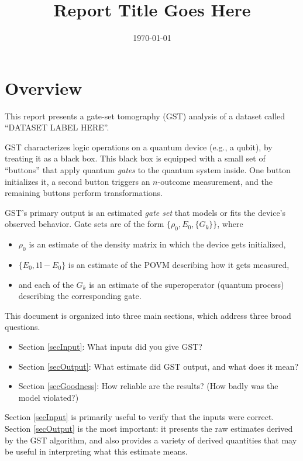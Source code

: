 \documentclass{article}[11pt]
\def\Id{1\!\mathrm{l}}
\newcommand{\putfield}[2]{#2}
\begin{document}
\title{\putfield{title}{Report Title Goes Here}}
\date{\vspace{-1cm}\today}

\begingroup
\let\center\flushleft
\let\endcenter\endflushleft
\maketitle
\endgroup

\tableofcontents

\section{Overview}
This report presents a gate-set tomography (GST) analysis of a dataset called ``\putfield{datasetLabel}{DATASET LABEL HERE}''.  

GST characterizes logic operations on a quantum device (e.g., a qubit), by treating it as a black box.  This black box is equipped with a small set of ``buttons'' that apply quantum \emph{gates} to the quantum system inside.  One button initializes it, a second button triggers an $n$-outcome measurement, and the remaining buttons perform transformations.  %

GST's primary output is an estimated \emph{gate set} that models or fits the device's observed behavior.  Gate sets are of the form $\{\rho_0,E_0,\{G_k\}\}$, where
\begin{itemize}
\item $\rho_0$ is an estimate of the density matrix in which the device gets initialized,
\item $\{E_0,\Id-E_0\}$ is an estimate of the POVM describing how it gets measured,
\item and each of the $G_k$ is an estimate of the superoperator (quantum process) describing the corresponding gate.
\end{itemize}

This document is organized into three main sections, which address three broad questions.
\begin{itemize}
\item Section \ref{secInput}:  What inputs did you give GST?
\item Section \ref{secOutput}:  What estimate did GST output, and what does it mean?
\item Section \ref{secGoodness}:  How reliable are the results? (How badly was the model violated?)
\end{itemize}
Section \ref{secInput} is primarily useful to verify that the inputs were correct.  Section \ref{secOutput} is the most important:  it presents the raw estimates derived by the GST algorithm, and also provides a variety of derived quantities that may be useful in interpreting what this estimate means.
\end{document}

